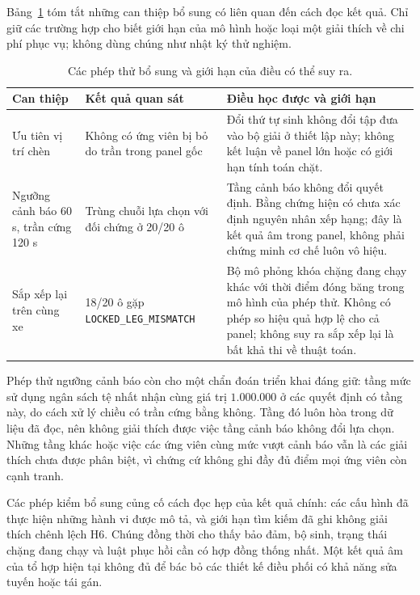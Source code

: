 Bảng~\ref{bang:kiemtra-am} tóm tắt những can thiệp bổ sung có liên quan đến cách
đọc kết quả. Chỉ giữ các trường hợp cho biết giới hạn của mô hình hoặc loại
một giải thích về chi phí phục vụ; không dùng chúng như nhật ký thử nghiệm.

\begin{table}[htbp]
\centering
\caption{Các phép thử bổ sung và giới hạn của điều có thể suy ra.}
\label{bang:kiemtra-am}
\small
\begin{tabular}{@{}p{2.9cm}p{4.1cm}p{7.8cm}@{}}
\toprule
\textbf{Can thiệp} & \textbf{Kết quả quan sát} & \textbf{Điều học được và giới hạn}\\
\midrule
Ưu tiên vị trí chèn & Không có ứng viên bị bỏ do trần trong panel gốc &
Đổi thứ tự sinh không đổi tập đưa vào bộ giải ở thiết lập này; không kết luận về
panel lớn hoặc có giới hạn tính toán chặt.\\
Ngưỡng cảnh báo 60 s, trần cứng 120 s & Trùng chuỗi lựa chọn với đối chứng ở 20/20 ô &
Tầng cảnh báo không đổi quyết định. Bằng chứng hiện có chưa xác định nguyên nhân
xếp hạng; đây là kết quả âm trong panel, không phải chứng minh cơ chế luôn vô hiệu.\\
Sắp xếp lại trên cùng xe & 18/20 ô gặp \texttt{LOCKED\_LEG\_MISMATCH} &
Bộ mô phỏng khóa chặng đang chạy khác với thời điểm đóng băng trong mô hình của
phép thử. Không có phép so hiệu quả hợp lệ cho cả panel; không suy ra sắp xếp lại
là bất khả thi về thuật toán.\\
\bottomrule
\end{tabular}
\end{table}

Phép thử ngưỡng cảnh báo còn cho một chẩn đoán triển khai đáng giữ: tầng mức sử
dụng ngân sách tệ nhất nhận cùng giá trị $1.000.000$ ở các quyết định có tầng này,
do cách xử lý chiều có trần cứng bằng không. Tầng đó luôn hòa trong dữ liệu đã
đọc, nên không giải thích được việc tầng cảnh báo không đổi lựa chọn. Những tầng
khác hoặc việc các ứng viên cùng mức vượt cảnh báo vẫn là các giải thích chưa
được phân biệt, vì chứng cứ không ghi đầy đủ điểm mọi ứng viên còn cạnh tranh.

Các phép kiểm bổ sung củng cố cách đọc hẹp của kết quả chính: các cấu hình đã
thực hiện những hành vi được mô tả, và giới hạn tìm kiếm đã ghi không giải thích
chênh lệch H6. Chúng đồng thời cho thấy bảo đảm, bộ sinh, trạng thái chặng đang
chạy và luật phục hồi cần có hợp đồng thống nhất. Một kết quả âm của tổ hợp hiện
tại không đủ để bác bỏ các thiết kế điều phối có khả năng sửa tuyến hoặc tái gán.
